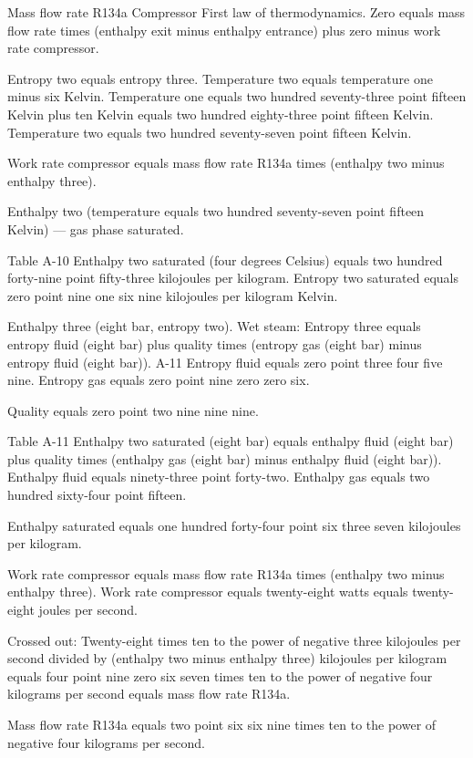 Mass flow rate R134a  
Compressor  
First law of thermodynamics.  
Zero equals mass flow rate times (enthalpy exit minus enthalpy entrance) plus zero minus work rate compressor.  

Entropy two equals entropy three.  
Temperature two equals temperature one minus six Kelvin.  
Temperature one equals two hundred seventy-three point fifteen Kelvin plus ten Kelvin equals two hundred eighty-three point fifteen Kelvin.  
Temperature two equals two hundred seventy-seven point fifteen Kelvin.  

Work rate compressor equals mass flow rate R134a times (enthalpy two minus enthalpy three).  

Enthalpy two (temperature equals two hundred seventy-seven point fifteen Kelvin) — gas phase saturated.  

Table A-10  
Enthalpy two saturated (four degrees Celsius) equals two hundred forty-nine point fifty-three kilojoules per kilogram.  
Entropy two saturated equals zero point nine one six nine kilojoules per kilogram Kelvin.  

Enthalpy three (eight bar, entropy two).  
Wet steam:  
Entropy three equals entropy fluid (eight bar) plus quality times (entropy gas (eight bar) minus entropy fluid (eight bar)).  
A-11  
Entropy fluid equals zero point three four five nine.  
Entropy gas equals zero point nine zero zero six.  

Quality equals zero point two nine nine nine.  

Table A-11  
Enthalpy two saturated (eight bar) equals enthalpy fluid (eight bar) plus quality times (enthalpy gas (eight bar) minus enthalpy fluid (eight bar)).  
Enthalpy fluid equals ninety-three point forty-two.  
Enthalpy gas equals two hundred sixty-four point fifteen.  

Enthalpy saturated equals one hundred forty-four point six three seven kilojoules per kilogram.  

Work rate compressor equals mass flow rate R134a times (enthalpy two minus enthalpy three).  
Work rate compressor equals twenty-eight watts equals twenty-eight joules per second.  

Crossed out:  
Twenty-eight times ten to the power of negative three kilojoules per second divided by (enthalpy two minus enthalpy three) kilojoules per kilogram equals four point nine zero six seven times ten to the power of negative four kilograms per second equals mass flow rate R134a.  

Mass flow rate R134a equals two point six six nine times ten to the power of negative four kilograms per second.